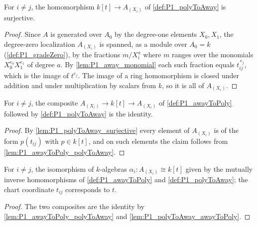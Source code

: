 \begin{lemma}
  \label{lem:P1_polyToAway_surjective}
  \leanok
  For \(i \neq j\), the homomorphism \(k[t] \to A_{(X_i)}\) of \ref{def:P1_polyToAway} is
  surjective.
\end{lemma}
\begin{proof}
  \leanok
  Since \(A\) is generated over \(A_0\) by the degree-one elements \(X_0, X_1\), the
  degree-zero localization \(A_{(X_i)}\) is spanned, as a module over \(A_0 = k\)
  (\ref{def:P1_gradeZero}), by the fractions \(m / X_i^a\) where \(m\) ranges over the
  monomials \(X_0^{e_0} X_1^{e_1}\) of degree \(a\). By \ref{lem:P1_away_monomial} each such
  fraction equals \(t_{ij}^{\,e_j}\), which is the image of \(t^{e_j}\). The image of a ring
  homomorphism is closed under addition and under multiplication by scalars from \(k\), so it
  is all of \(A_{(X_i)}\).
\end{proof}

\begin{lemma}
  \label{lem:P1_polyToAway_awayToPoly}
  \leanok
  For \(i \neq j\), the composite \(A_{(X_i)} \to k[t] \to A_{(X_i)}\) of
  \ref{def:P1_awayToPoly} followed by \ref{def:P1_polyToAway} is the identity.
\end{lemma}
\begin{proof}
  \leanok
  By \ref{lem:P1_polyToAway_surjective} every element of \(A_{(X_i)}\) is of the form
  \(p(t_{ij})\) with \(p \in k[t]\), and on such elements the claim follows from
  \ref{lem:P1_awayToPoly_polyToAway}.
\end{proof}

\begin{definition}
  \label{def:P1_awayAlgEquiv}
  \leanok
  For \(i \neq j\), the isomorphism of \(k\)-algebras
  \(\alpha_i : A_{(X_i)} \cong k[t]\) given by the mutually inverse homomorphisms of
  \ref{def:P1_awayToPoly} and \ref{def:P1_polyToAway}; the chart coordinate \(t_{ij}\)
  corresponds to \(t\).
\end{definition}
\begin{proof}
  \leanok
  The two composites are the identity by \ref{lem:P1_awayToPoly_polyToAway} and
  \ref{lem:P1_polyToAway_awayToPoly}.
\end{proof}

